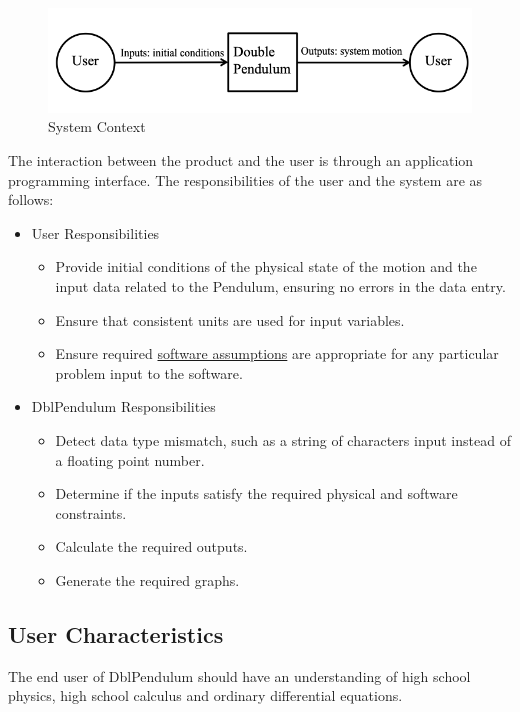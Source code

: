 \documentclass[12pt]{article}
\begin{document}
\begin{figure}
\begin{center}
\includegraphics[width=\textwidth]{../../../../datafiles/dblpendulum/SystemContextFigure.png}
\caption{System Context}
\label{Figure:sysCtxDiag}
\end{center}
\end{figure}
The interaction between the product and the user is through an application programming interface. The responsibilities of the user and the system are as follows:

\begin{itemize}
\item{User Responsibilities}
\begin{itemize}
\item{Provide initial conditions of the physical state of the motion and the input data related to the Pendulum, ensuring no errors in the data entry.}
\item{Ensure that consistent units are used for input variables.}
\item{Ensure required \hyperref[Sec:Assumps]{software assumptions} are appropriate for any particular problem input to the software.}
\end{itemize}
\item{DblPendulum Responsibilities}
\begin{itemize}
\item{Detect data type mismatch, such as a string of characters input instead of a floating point number.}
\item{Determine if the inputs satisfy the required physical and software constraints.}
\item{Calculate the required outputs.}
\item{Generate the required graphs.}
\end{itemize}
\end{itemize}
\subsection{User Characteristics}
\label{Sec:UserChars}
The end user of DblPendulum should have an understanding of high school physics, high school calculus and ordinary differential equations.
\end{document}
